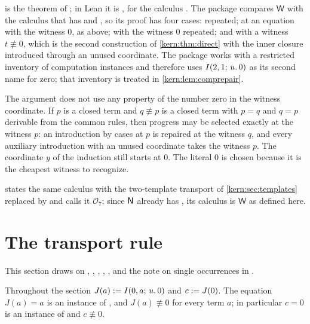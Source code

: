 \begin{remark}
\label{kern:rem:witness-sources}
 is the theorem of ; in Lean it is
, for the calculus .  The package compares
$\mathsf{W}$ with the calculus that has  and , so
its proof has four cases:  repeated;  at an
equation with the witness $0$, as above;  with the witness $0$
repeated; and  with a witness $t\not\equiv 0$, which is the
second construction of \cref{kern:thm:direct} with the inner closure
introduced through an unused coordinate.  The package works with a
restricted inventory of computation instances and therefore uses
$I(2,1;\,u.\,0)$ as its second name for zero; that inventory is treated in
\cref{kern:lem:comprepair}.

The argument does not use any property of the number zero in the witness
coordinate.  If $p$ is a closed term and $q\not\equiv p$ is a closed term
with $p=q$ and $q=p$ derivable from the common rules, then progress may be
selected exactly at the witness $p$: an introduction by cases at $p$ is
repaired at the witness $q$, and every auxiliary introduction with an unused
coordinate takes the witness $p$.  The coordinate $y$ of the induction still
starts at $0$.  The literal $0$ is chosen because it is the cheapest witness
to recognize.

 states the same calculus with the two-template transport
of \cref{kern:sec:templates} replaced by  and calls it
$\mathcal{O}_7$; since $\mathsf{N}$ already has , its calculus is
$\mathsf{W}$ as defined here.
\end{remark}

\section{The transport rule}
\label{kern:sec:transport}

This section draws on , ,
, , ,
 and the note on single occurrences in
.

Throughout the section $J(a)\mathrel{:=}I(0,a;\,u.\,0)$ and $c\mathrel{:=} J(0)$.  The
equation $J(a)=a$ is an instance of , and $J(a)\not\equiv 0$ for
every term $a$; in particular $c=0$ is an instance of  and
$c\not\equiv 0$.

